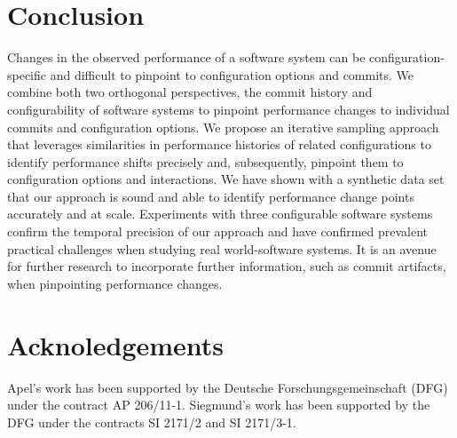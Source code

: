 \documentclass[sigconf]{acmart}
\begin{document}
	\section{Conclusion}
	{\color{red}Changes in the observed performance of a software system can be configuration-specific and difficult to pinpoint to configuration options and commits. We combine both two orthogonal perspectives, the commit history and configurability of software systems to pinpoint performance changes to individual commits and configuration options. 
	We propose an iterative sampling approach that leverages similarities in performance histories of related configurations to identify performance shifts precisely and, subsequently, pinpoint them to configuration options and interactions. 
	We have shown with a synthetic data set that our approach is sound and able to identify performance change points accurately and at scale. Experiments with three configurable software systems confirm the temporal precision of our approach and have confirmed prevalent practical challenges when studying real world-software systems. It is an avenue for further research to incorporate further information, such as commit artifacts, when pinpointing performance changes.}
	
	\section{Acknoledgements}
	Apel’s work has been supported by the Deutsche Forschungsgemeinschaft (DFG) under the contract AP 206/11-1. Siegmund’s work has been supported by the DFG under the
	contracts SI 2171/2 and SI 2171/3-1.
	
	\clearpage
	
	
	
	\clearpage
	
	
\end{document}
